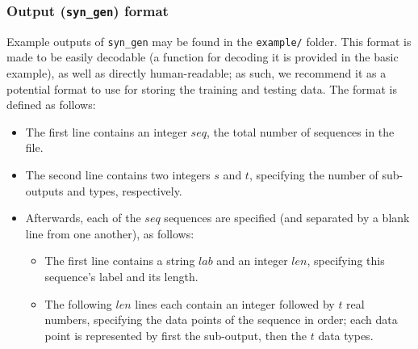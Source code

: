 \documentclass[12pt,openany]{article}
\begin{document}
	\subsubsection{Output ({\tt syn\_gen}) format}
	Example outputs of {\tt syn\_gen} may be found in the {\tt example/} folder. This format is made to be easily decodable (a function for decoding it is provided in the basic example), as well as directly human-readable; as such, we recommend it as a potential format to use for storing the training and testing data. The format is defined as follows:
	\begin{itemize}
		\item The first line contains an integer $seq$, the total number of sequences in the file.
		\item The second line contains two integers $s$ and $t$, specifying the number of sub-outputs and types, respectively.
		\item Afterwards, each of the $seq$ sequences are specified (and separated by a blank line from one another), as follows:
		\begin{itemize}
			\item The first line contains a string $lab$ and an integer $len$, specifying this sequence's label and its length.
			\item The following $len$ lines each contain an integer followed by $t$ real numbers, specifying the data points of the sequence in order; each data point is represented by first the sub-output, then the $t$ data types.
		\end{itemize}
	\end{itemize}
\end{document}
